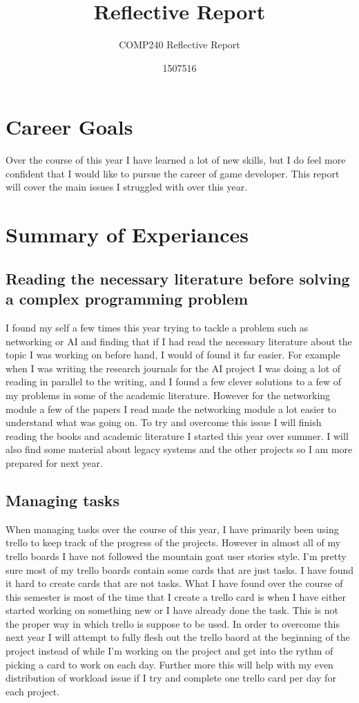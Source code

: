 \documentclass{scrartcl}
\title{Reflective Report}
\subtitle{COMP240 Reflective Report}
\author{1507516}
\begin{document}
\maketitle


\section{Career Goals}
Over the course of this year I have learned a lot of new skills, but I do feel more confident that I would like to pursue the career of game developer.
This report will cover the main issues I struggled with over this year.


\section{Summary of Experiances}
\subsection{Reading the necessary literature before solving a complex programming problem}
I found my self a few times this year trying to tackle a problem such as networking or AI and finding that if I had read the necessary literature about the topic I was working on before hand, I would of found it far easier. For example when I was writing the research journals for the AI project I was doing a lot of reading in parallel to the writing, and I found a few clever solutions to a few of my problems in some of the academic literature. However for the networking module a few of the papers I read made the networking module a lot easier to understand what was going on.
To try and overcome this issue I will finish reading the books and academic literature I started this year over summer. I will also find some material about legacy systems and the other projects so I am more prepared for next year.

\subsection{Managing tasks}
When managing tasks over the course of this year, I have primarily been using trello to keep track of the progress of the projects. However in almost all of my trello boards I have not followed the mountain goat user stories style. I'm pretty sure most of my trello boards contain some cards that are just tasks. I have found it hard to create cards that are not tasks. What I have found over the course of this semester is most of the time that I create a trello card is when I have either started working on something new or I have already done the task. This is not the proper way in which trello is suppose to be used.
In order to overcome this next year I will attempt to fully flesh out the trello baord at the beginning of the project instead of while I'm working on the project and get into the rythm of picking a card to work on each day. Further more this will help with my even distribution of workload issue if I try and complete one trello card per day for each project.
\end{document}

